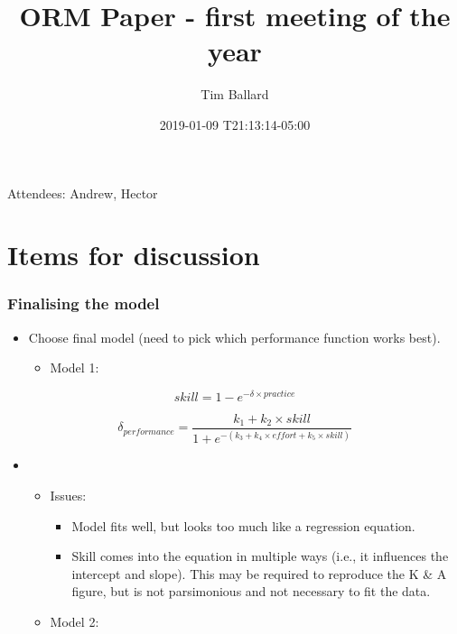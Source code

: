 \documentclass[]{article}
\title{ORM Paper - first meeting of the year}
\author{Tim Ballard}
\date{2019-01-09 T21:13:14-05:00}
\providecommand{\tightlist}{%
  \setlength{\itemsep}{0pt}\setlength{\parskip}{0pt}}
\begin{document}
\maketitle

Attendees: Andrew, Hector

\hypertarget{items-for-discussion}{%
\section{Items for discussion}\label{items-for-discussion}}

\hypertarget{finalising-the-model}{%
\subsubsection{Finalising the model}\label{finalising-the-model}}

\begin{itemize}
\item
  Choose final model (need to pick which performance function works
  best).

  \begin{itemize}
  \tightlist
  \item
    Model 1:
  \end{itemize}
\end{itemize}

\[skill = 1 - e^{-\delta \times practice}\]

\[\delta_{performance} = \frac{k_1 + k_2 \times skill}{1 + e^{-(k_3 + k_4 \times effort + k_5 \times skill)}}\]

\begin{itemize}
\item
  \begin{itemize}
  \item
    Issues:

    \begin{itemize}
    \item
      Model fits well, but looks too much like a regression equation.
    \item
      Skill comes into the equation in multiple ways (i.e., it
      influences the intercept and slope). This may be required to
      reproduce the K \& A figure, but is not parsimonious and not
      necessary to fit the data.
    \end{itemize}
  \item
    Model 2:
  \end{itemize}
\end{itemize}
\end{document}
